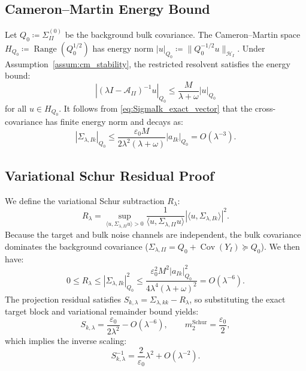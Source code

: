 \subsection{Cameron--Martin Energy Bound}

Let $Q_0\coloneqq\Sigma_{II}^{(0)}$ be the background bulk covariance. The Cameron--Martin space $H_{Q_0}\coloneqq\operatorname{Range}(Q_0^{1/2})$ has energy norm $|u|_{Q_0}\coloneqq\|Q_0^{-1/2} u\|_{\mathcal{H}_I}$.
Under Assumption~\ref{assum:cm_stability}, the restricted resolvent satisfies the energy bound:
\begin{equation}
  |(\lambda I - \mathcal{A}_{II})^{-1} u|_{Q_0} \le \frac{M}{\lambda+\omega} |u|_{Q_0}
  \label{eq:cm_resolvent}
\end{equation}
for all $u \in H_{Q_0}$. It follows from \eqref{eq:SigmaIk_exact_vector} that the cross-covariance has finite energy norm and decays as:
\begin{equation}
 |\Sigma_{\lambda,Ik}|_{Q_0} \le \frac{\varepsilon_0 M}{2\lambda^2(\lambda+\omega)} |a_{Ik}|_{Q_0} = O(\lambda^{-3}).
 \label{eq:cross_energy}
\end{equation}

\subsection{Variational Schur Residual Proof}

We define the variational Schur subtraction $R_\lambda$:
\begin{equation}
 R_\lambda = \sup_{\langle u,\Sigma_{\lambda,II}u\rangle>0} \frac{1}{\langle u,\Sigma_{\lambda,II}u\rangle} |\langle u,\Sigma_{\lambda,Ik}\rangle|^2.
 \label{eq:schur_variational}
\end{equation}
Because the target and bulk noise channels are independent, the bulk covariance dominates the background covariance ($\Sigma_{\lambda,II} = Q_0 + \operatorname{Cov}(Y_I) \succeq Q_0$). We then have:
\begin{equation}
 0\le R_\lambda\le|\Sigma_{\lambda,Ik}|_{Q_0}^2 \le \frac{\varepsilon_0^2 M^2 |a_{Ik}|_{Q_0}^2}{4 \lambda^4 (\lambda+\omega)^2} = O(\lambda^{-6}).
\end{equation}
The projection residual satisfies $S_{k,\lambda} = \Sigma_{\lambda,kk} - R_\lambda$, so substituting the exact target block and variational remainder bound yields:
\begin{equation}
 S_{k,\lambda} = \frac{\varepsilon_0}{2\lambda^2} - O(\lambda^{-6}),\qquad m_2^{\mathrm{Schur}}=\frac{\varepsilon_0}{2},
 \label{eq:Schur_asympt}
\end{equation}
which implies the inverse scaling:
\begin{equation}
  S_{k,\lambda}^{-1} = \frac{2}{\varepsilon_0}\lambda^2 + O(\lambda^{-2}).
\end{equation}

